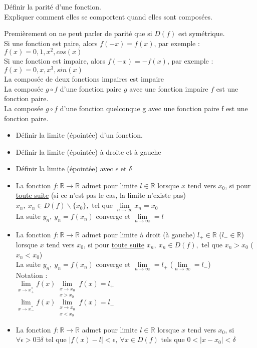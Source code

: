 \documentclass[12pt]{article}
\newcommand*{\xfield}[1]{\begin{mdframed}\centering #1\end{mdframed}\bigskip}
\newenvironment{note}{}{}
\begin{document}
\begin{note}
    \xfield{
        Définir la parité d'une fonction.\\
        Expliquer comment elles se comportent quand elles sont composées.
    }
    \xfield{
        Premièrement on ne peut parler de parité que si $D(f)$ est symétrique.\\
        Si une fonction est paire, alors $f(-x) = f(x)$, par exemple : $f(x) = 0,1 , x^2, cos(x)$\\
        Si une fonction est impaire, alors $f(-x) = -f(x)$, par exemple : $f(x) = 0,x,x^3,sin(x)$\\
        La composée de deux fonctions impaires est impaire\\
        La composée $g \circ f$ d'une fonction paire $g$ avec une fonction impaire $f$ est une fonction paire.\\
        La composée $g \circ f$ d'une fonction quelconque g avec une fonction paire f est une fonction paire.}
\end{note}

\begin{note}
	\xfield{\begin{itemize}
	\item Définir la limite (épointée) d'un fonction.
	\item Définir la limite (épointée) à droite et à gauche
	\item Définir la limite (épointée) avec $\epsilon$ et $\delta$
	\end{itemize} }
	\xfield{\begin{itemize}
	\item La fonction $f : \mathbb{R} \rightarrow \mathbb{R}$ admet pour limite $l \in \mathbb{R}$ lorsque $x$ tend vers $x_0$, si pour \underline{toute suite} (si ce n'est pas le cas, la limite n'existe pas) $x_n,\ x_n \in D(f) \smallsetminus \{x_0\},$ tel que $\lim\limits_{n \to \infty}x_n = x_0$ \\
	La suite $y_n,\ y_n = f(x_n)$ converge et $\lim\limits_{n \to \infty} = l$
	\item La fonction $f : \mathbb{R} \rightarrow \mathbb{R}$ admet pour limite à droit (à gauche) $l_+ \in \mathbb{R}$ ($l_- \in \mathbb{R}$) lorsque $x$ tend vers $x_0$, si pour \underline{toute suite} $x_n,\ x_n \in D(f),$ tel que $x_n > x_0$ ($x_n < x_0$) \\
	La suite $y_n,\ y_n = f(x_n)$ converge et $\lim\limits_{n \to \infty} = l_+$ ($\lim\limits_{n \to \infty} = l_-$)\\
	Notation :\\
	$\lim\limits_{x \to x_+^*}f(x)\lim\limits_{\substack{x \to x_0 \\ x > x_0}}f(x) = l_+$\\
	$\lim\limits_{x \to x_-^*}f(x)\lim\limits_{\substack{x \to x_0 \\ x < x_0}}f(x) = l_-$
	\item La fonction $f : \mathbb{R} \rightarrow \mathbb{R}$ admet pour limite $l \in \mathbb{R}$ lorsque $x$ tend vers $x_0$, si $\forall \epsilon > 0 \exists \delta$ tel que $|f(x) -l| < \epsilon,\ \forall x \in D(f)$ tels que $0< |x-x_0| < \delta$
	\end{itemize} }
\end{note}
\end{document}

